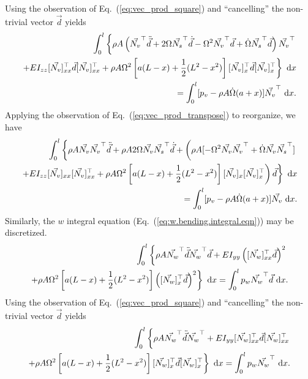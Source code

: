 Using the observation of Eq.~(\ref{eq:vec_prod_square}) and ``cancelling'' the non-trivial vector $\vec d$ yields
\begin{eqnarray}
\int_0^l\left\lbrace\rho A\left(\vec{N_v}^\top\ddot{\vec d} + 2\Omega\vec{N_s}^\top\dot{\vec d}-\Omega^2\vec{N_v}^\top\vec{d}+\dot\Omega \vec{N_s}^\top\vec{d}\right)\vec{N_v}^\top\vphantom{\frac{0}{0}}\right.\nonumber \\
\left.+EI_{zz}[\vec{N_v}]_{xx}^\top\vec{d}[\vec{N_v}]_{xx}^\top+\rho A\Omega^2\left[a(L-x)+\frac{1}{2}(L^2-x^2)\right][\vec{N_v}]_{x}^\top\vec{d}[\vec{N_v}]_{x}^\top\right\rbrace\text{ d}x \\
= \int_0^l[p_v - \rho A\dot\Omega(a+x)]\vec{N_v}^\top\text{ d}x. \nonumber
\end{eqnarray}
Applying the observation of Eq.~(\ref{eq:vec_prod_transpose}) to reorganize, we have
\begin{eqnarray}
\label{eq:v.disc.final}
\int_0^l\left\lbrace\rho A\vec{N_v}\vec{N_v}^\top\ddot{\vec d} + \rho A 2\Omega\vec{N_v}\vec{N_s}^\top\dot{\vec d}+\left(\rho A[-\Omega^2\vec{N_v}\vec{N_v}^\top+\dot\Omega \vec{N_v}\vec{N_s}^\top]\vphantom{\frac{0}{0}}\right.\right.\nonumber \\
\left.\left.+EI_{zz}[\vec{N_v}]_{xx}[\vec{N_v}]_{xx}^\top+\rho A\Omega^2\left[a(L-x)+\frac{1}{2}(L^2-x^2)\right][\vec{N_v}]_{x}[\vec{N_v}]_{x}^\top\right)\vec{d}\right\rbrace\text{ d}x \\
= \int_0^l[p_v - \rho A\dot\Omega(a+x)]\vec{N_v}\text{ d}x. \nonumber
\end{eqnarray}
Similarly, the $w$ integral equation (Eq.~(\ref{eq:w.bending.integral.eqn})) may be discretized.
\begin{eqnarray}
\int_0^l\left\lbrace\rho A\vec{N_w}^\top\ddot{\vec{d}}\vec{N_w}^\top\vec{d}+EI_{yy}\left([\vec{N_w}]_{xx}^\top\vec{d}\right)^2\vphantom{\frac{0}{0}}\right.  \\
\left.+\rho A\Omega^2\left[a(L-x)+\frac{1}{2}(L^2-x^2)\right]\left([\vec{N_w}]_{x}^\top\vec{d}\right)^2\right\rbrace\text{ d}x 
= \int_0^lp_w\vec{N_w}^\top\vec{d}\text{ d}x. \nonumber 
\end{eqnarray}
Using the observation of Eq.~(\ref{eq:vec_prod_square}) and ``cancelling'' the non-trivial vector $\vec d$ yields
\begin{eqnarray}
\int_0^l\left\lbrace\rho A\vec{N_w}^\top\ddot{\vec{d}}\vec{N_w}^\top+EI_{yy}[\vec{N_w}]_{xx}^\top\vec{d}[\vec{N_w}]_{xx}^\top\vphantom{\frac{0}{0}}\right.  \\
\left.+\rho A\Omega^2\left[a(L-x)+\frac{1}{2}(L^2-x^2)\right][\vec{N_w}]_{x}^\top\vec{d}[\vec{N_w}]_{x}^\top\right\rbrace\text{ d}x 
= \int_0^lp_w\vec{N_w}^\top\text{ d}x. \nonumber 
\end{eqnarray}
